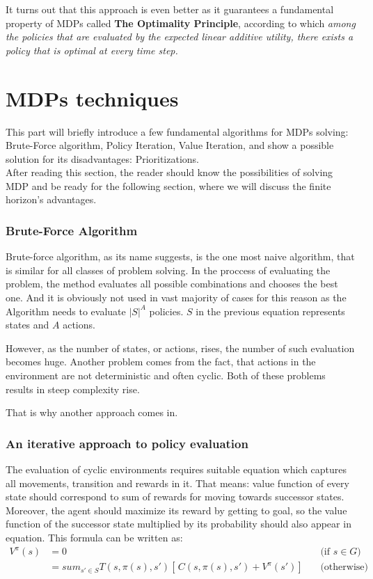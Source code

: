It turns out that this approach is even better as it guarantees a fundamental property of MDPs called \textbf{The Optimality Principle}, according to which \textit{among the policies that are evaluated by the expected linear additive utility, there exists a policy that is optimal at every time step.}

\section{MDPs techniques}

This part will briefly introduce a few fundamental algorithms for MDPs solving: Brute-Force algorithm, Policy Iteration, Value Iteration, and show a possible solution for its disadvantages: Prioritizations. \\
After reading this section, the reader should know the possibilities of solving MDP and be ready for the following section, where we will discuss the finite horizon's advantages.

\subsubsection{Brute-Force Algorithm}
Brute-force algorithm, as its name suggests, is the one most naive algorithm, that is similar for all classes of problem solving. In the proccess of evaluating the problem, the method evaluates all possible combinations and chooses the best one.
And it is obviously not used in vast majority of cases for this reason as the Algorithm needs to evaluate $|S|^{A}$ policies.
$S$ in the previous equation represents states and $A$ actions.

However, as the number of states, or actions, rises, the number of such evaluation becomes huge. Another problem comes from the fact, that actions in the environment are not deterministic and often cyclic. Both of these problems results in steep complexity rise.

That is why another approach comes in.

\subsubsection{An iterative approach to policy evaluation}

The evaluation of cyclic environments requires suitable equation which captures all movements, transition and rewards in it.
That means: value function of every state should correspond to sum of rewards for moving towards successor states. Moreover, the agent should maximize its reward by getting to goal, so the value function of the successor state multiplied by its probability should also appear in equation. This formula can be written as:\\
\begin{equation}
\begin{aligned}
V^{\pi} (s) & = 0 && \text{(if $s \in G$)} \\
& = sum_{s' \in S} T(s, \pi (s), s') [ \,C(s, \pi(s), s') + V^{\pi} (s')] \, && \text{(otherwise)}
\end{aligned}
\end{equation}

